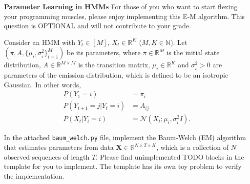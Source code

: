 \documentclass[12pt,letterpaper, onecolumn]{exam}
\newcommand{\Ncal}{\mathcal{N}}
\begin{document}
\begin{questions}
\begin{solution}
    \begin{parts}
        \part  
        \part  
        \part  
        \part  
    \end{parts}
\end{solution}


 \textbf{Parameter Learning in HMMs}\droppoints 
For those of you who want to start flexing your programming muscles, please enjoy implementing this E-M algorithm. This question is OPTIONAL and will not contribute to your grade.

\begin{figure}[h]
\centering
{}
\end{figure}

Consider an HMM with $ Y_t \in [M] $, $ X_t \in \mathbb{R}^{K} $ ($ M, K \in \mathbb{N} $).
Let $ (\pi, A, \{\mu_i, \sigma_i^2\}_{i=1}^M) $ be its parameters, where $ \pi \in \mathbb{R}^{M} $ is the initial state distribution, $ A \in \mathbb{R}^{M \times M} $ is the transition matrix, $ \mu_i \in \mathbb{R}^{K} $ and $ \sigma_i^2 > 0 $ are parameters of the emission distribution, which is defined to be an isotropic Gaussian. 
In other words,
\begin{align}
P(Y_1 = i) & = \pi_{i} \\
P(Y_{t+1} = j | Y_t = i) & = A_{ij} \\
P(X_t | Y_t = i) & = \Ncal(X_t; \mu_i, \sigma_i^2 I).
\end{align}


In the attached \verb|baum_welch.py| file, implement the Baum-Welch (EM) algorithm that estimates parameters from data $ \boldsymbol{X} \in \mathbb{R}^{N \times T \times K} $, which is a collection of $ N $ observed sequences of length $ T $. 
Please find unimplemented TODO blocks in the template for you to implement.
The template has its own toy problem to verify the implementation. 


\end{questions}
\end{document}
